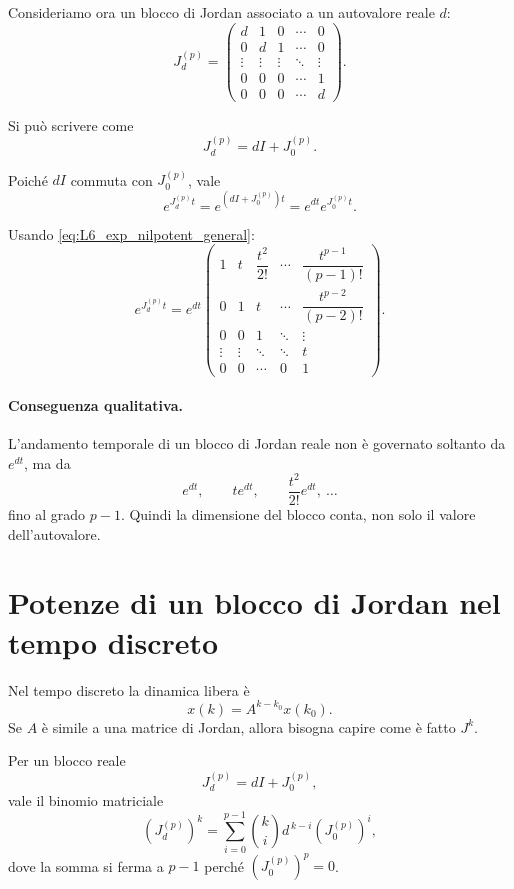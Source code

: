 Consideriamo ora un blocco di Jordan associato a un autovalore reale $d$:
\begin{equation}
J_d^{(p)}=
\begin{pmatrix}
d & 1 & 0 & \cdots & 0\\
0 & d & 1 & \cdots & 0\\
\vdots & \vdots & \vdots & \ddots & \vdots\\
0 & 0 & 0 & \cdots & 1\\
0 & 0 & 0 & \cdots & d
\end{pmatrix}.
\label{eq:L6_jordan_block_real}
\end{equation}

Si può scrivere come
\[
J_d^{(p)}=dI+J_0^{(p)}.
\]

Poiché $dI$ commuta con $J_0^{(p)}$, vale
\[
e^{J_d^{(p)}t}=e^{(dI+J_0^{(p)})t}=e^{dt}e^{J_0^{(p)}t}.
\]

Usando \eqref{eq:L6_exp_nilpotent_general}:
\begin{equation}
e^{J_d^{(p)}t}
=
e^{dt}
\begin{pmatrix}
1 & t & \dfrac{t^2}{2!} & \cdots & \dfrac{t^{p-1}}{(p-1)!}\\
0 & 1 & t & \cdots & \dfrac{t^{p-2}}{(p-2)!}\\
0 & 0 & 1 & \ddots & \vdots\\
\vdots & \vdots & \ddots & \ddots & t\\
0 & 0 & \cdots & 0 & 1
\end{pmatrix}.
\label{eq:L6_exp_jordan_real_block}
\end{equation}

\paragraph{Conseguenza qualitativa.}
L'andamento temporale di un blocco di Jordan reale non è governato soltanto da $e^{dt}$, ma da
\[
e^{dt},\qquad te^{dt},\qquad \frac{t^2}{2!}e^{dt},\ \dots
\]
fino al grado $p-1$.  
Quindi la dimensione del blocco conta, non solo il valore dell'autovalore.

\section{Potenze di un blocco di Jordan nel tempo discreto}

Nel tempo discreto la dinamica libera è
\[
x(k)=A^{k-k_0}x(k_0).
\]
Se $A$ è simile a una matrice di Jordan, allora bisogna capire come è fatto $J^k$.

Per un blocco reale
\[
J_d^{(p)}=dI+J_0^{(p)},
\]
vale il binomio matriciale
\begin{equation}
\left(J_d^{(p)}\right)^k
=
\sum_{i=0}^{p-1}\binom{k}{i}d^{\,k-i}\left(J_0^{(p)}\right)^i,
\label{eq:L6_power_jordan_block}
\end{equation}
dove la somma si ferma a $p-1$ perché $\left(J_0^{(p)}\right)^p=0$.

